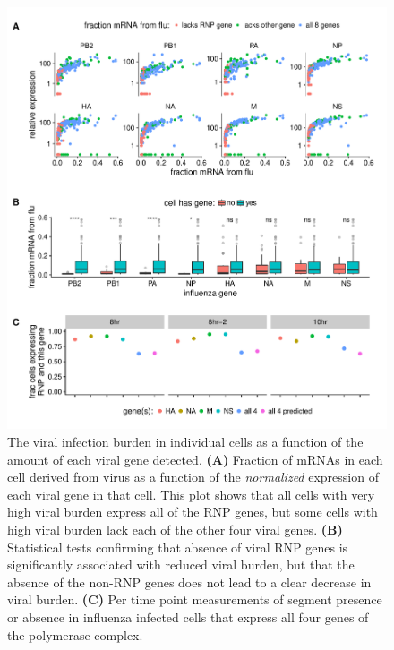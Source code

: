 \documentclass[9pt,lineno]{elife}
\begin{document}
\begin{figure}
\includegraphics[width=\linewidth]{figures/p_flu_burden_flu_gene_merge.pdf}
\caption{\label{fig:fluburdenbyflugene}
The viral infection burden in individual cells as a function of the amount of each viral gene detected.
{\bf (A)} 
Fraction of mRNAs in each cell derived from virus as a function of the \emph{normalized} expression of each viral gene in that cell.
This plot shows that all cells with very high viral burden express all of the RNP genes, but some cells with high viral burden lack each of the other four viral genes.
{\bf (B)}
Statistical tests confirming that absence of viral RNP genes is significantly associated with reduced viral burden, but that the absence of the non-RNP genes does not lead to a clear decrease in viral burden.
{\bf (C)}
Per time point measurements of segment presence or absence in influenza infected cells that express all four genes of the polymerase complex. 
}
\end{figure}
\end{document}
